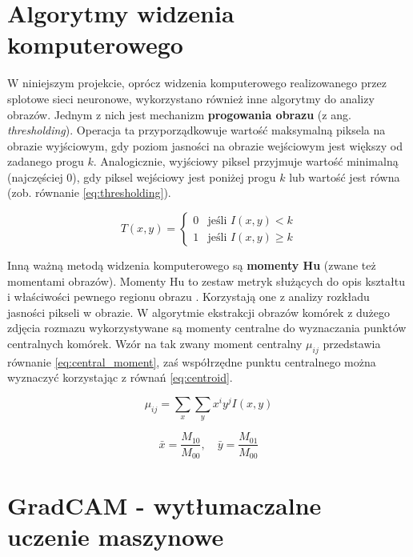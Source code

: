 \section{Algorytmy widzenia komputerowego}

W niniejszym projekcie, oprócz widzenia komputerowego realizowanego przez splotowe sieci neuronowe, wykorzystano również inne algorytmy do analizy obrazów.
Jednym z nich jest mechanizm \textbf{progowania obrazu} (z ang. \textit{thresholding}).
Operacja ta przyporządkowuje wartość maksymalną piksela na obrazie wyjściowym, gdy poziom jasności na obrazie wejściowym jest większy od zadanego progu $k$.
Analogicznie, wyjściowy piksel przyjmuje wartość minimalną (najczęściej $0$), gdy piksel wejściowy jest poniżej progu $k$ lub wartość jest równa (zob. równanie \ref{eq:thresholding}).

\begin{equation}
    T(x, y) =
\begin{cases}
0 & \text{jeśli } I(x, y) < k \\
1 & \text{jeśli } I(x, y) \geq k
\end{cases}\label{eq:thresholding}
\end{equation}

Inną ważną metodą widzenia komputerowego są \textbf{momenty Hu} (zwane też momentami obrazów).
Momenty Hu to zestaw metryk służących do opis kształtu i właściwości pewnego regionu obrazu \cite{vision}.
Korzystają one z analizy rozkładu jasności pikseli w obrazie.
W algorytmie ekstrakcji obrazów komórek z dużego zdjęcia rozmazu wykorzystywane są momenty centralne do wyznaczania punktów centralnych komórek.
Wzór na tak zwany moment centralny $\mu_{ij}$ przedstawia równanie \ref{eq:central_moment}, zaś współrzędne punktu centralnego można wyznaczyć korzystając z równań \ref{eq:centroid}.

\begin{equation}
    \mu_{ij} = \sum_x \sum_y x^i y^j I(x, y)\label{eq:central_moment}
\end{equation}

\begin{equation}
    \bar{x} = \frac{M_{10}}{M_{00}}, \quad \bar{y} = \frac{M_{01}}{M_{00}}\label{eq:centroid}
\end{equation}


\section{GradCAM - wytłumaczalne uczenie maszynowe}